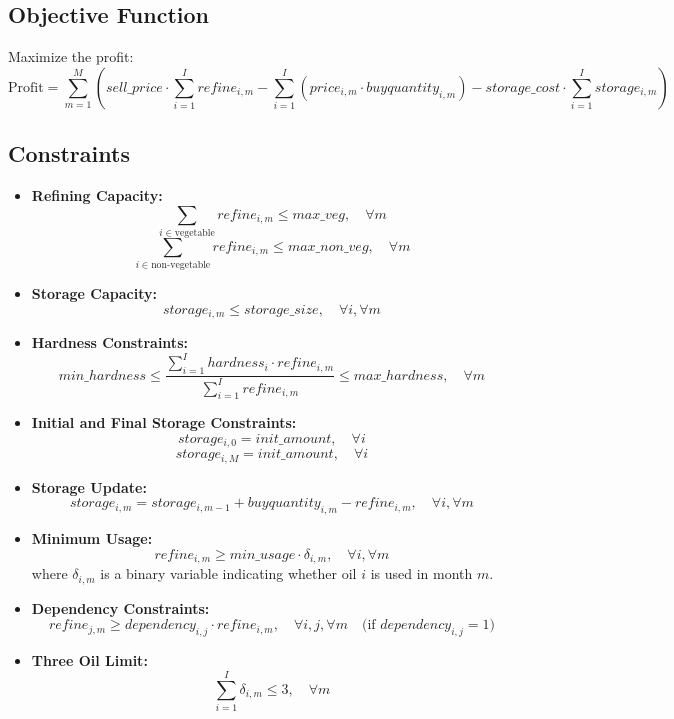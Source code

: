\documentclass{article}
\begin{document}
\subsection*{Objective Function}
Maximize the profit:
\[
\text{Profit} = \sum_{m=1}^{M} \left( sell\_price \cdot \sum_{i=1}^{I} refine_{i,m} - \sum_{i=1}^{I} (price_{i,m} \cdot buyquantity_{i,m}) - storage\_cost \cdot \sum_{i=1}^{I} storage_{i,m} \right)
\]

\subsection*{Constraints}

\begin{itemize}
    \item \textbf{Refining Capacity:}
    \[
    \sum_{i \in \text{vegetable}} refine_{i,m} \leq max\_veg, \quad \forall m
    \]
    \[
    \sum_{i \in \text{non-vegetable}} refine_{i,m} \leq max\_non\_veg, \quad \forall m
    \]
    
    \item \textbf{Storage Capacity:}
    \[
    storage_{i,m} \leq storage\_size, \quad \forall i, \forall m
    \]
    
    \item \textbf{Hardness Constraints:}
    \[
    min\_hardness \leq \frac{\sum_{i=1}^{I} hardness_{i} \cdot refine_{i,m}}{\sum_{i=1}^{I} refine_{i,m}} \leq max\_hardness, \quad \forall m
    \]
    
    \item \textbf{Initial and Final Storage Constraints:}
    \[
    storage_{i,0} = init\_amount, \quad \forall i
    \]
    \[
    storage_{i,M} = init\_amount, \quad \forall i
    \]
    
    \item \textbf{Storage Update:}
    \[
    storage_{i,m} = storage_{i,m-1} + buyquantity_{i,m} - refine_{i,m}, \quad \forall i, \forall m
    \]
    
    \item \textbf{Minimum Usage:}
    \[
    refine_{i,m} \geq min\_usage \cdot \delta_{i,m}, \quad \forall i, \forall m
    \]
    where \( \delta_{i,m} \) is a binary variable indicating whether oil \( i \) is used in month \( m \).

    \item \textbf{Dependency Constraints:}
    \[
    refine_{j,m} \geq dependency_{i,j} \cdot refine_{i,m}, \quad \forall i,j, \forall m \quad \text{(if } dependency_{i,j} = 1)
    \]
    
    \item \textbf{Three Oil Limit:}
    \[
    \sum_{i=1}^{I} \delta_{i,m} \leq 3, \quad \forall m
    \]
\end{itemize}
\end{document}
